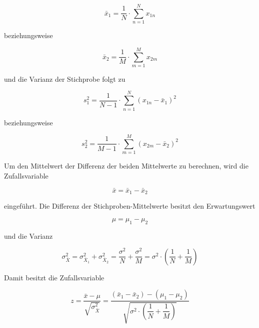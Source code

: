 \begin{equation}\label{eq:fiveseventyfive}
\bar{x}_{1} =\dfrac{1}{N} \cdot \sum _{n=1}^{N}x_{1n}
\end{equation}

\noindent beziehungsweise

\begin{equation}\label{eq:fiveseventysix}
\bar{x}_{2} =\dfrac{1}{M} \cdot \sum _{m=1}^{M}x_{2m}
\end{equation}

\noindent und die Varianz der Stichprobe folgt zu

\begin{equation}\label{eq:fiveseventyseven}
s_{1}^{2} =\dfrac{1}{N-1} \cdot \sum _{n=1}^{N}\left(x_{1n} -\bar{x}_{1} \right)^{2}
\end{equation}

\noindent beziehungsweise

\begin{equation}\label{eq:fiveseventyeight}
s_{2}^{2} =\dfrac{1}{M-1} \cdot \sum _{m=1}^{M}\left(x_{2m} -\bar{x}_{2} \right)^{2}
\end{equation}

\noindent Um den Mittelwert der Differenz der beiden Mittelwerte zu berechnen, wird die Zufallsvariable 

\begin{equation}\label{eq:fiveseventynine}
\bar{x}=\bar{x}_{1} -\bar{x}_{2}
\end{equation}

\noindent eingef\"{u}hrt. Die Differenz der Stichproben-Mittelwerte besitzt den Erwartungswert 

\begin{equation}\label{eq:fiveeighty}
\mu =\mu _{1} -\mu _{2}
\end{equation}

\noindent und die Varianz 

\begin{equation}\label{eq:fiveeightyone}
\sigma _{\bar{X}}^{2} =\sigma _{\bar{X}_{1} }^{2} +\sigma _{\bar{X}_{2} }^{2} =\dfrac{\sigma ^{2} }{N} +\dfrac{\sigma ^{2} }{M} =\sigma ^{2} \cdot \left(\dfrac{1}{N} +\dfrac{1}{M} \right)
\end{equation}

\noindent Damit besitzt die Zufallsvariable

\begin{equation}\label{eq:fiveeightytwo}
z=\dfrac{\bar{x}-\mu }{\sqrt{\sigma _{\bar{X}}^{2} } } =\dfrac{\left(\bar{x}_{1} -\bar{x}_{2} \right)-\left(\mu _{1} -\mu _{2} \right)}{\sqrt{\sigma ^{2} \cdot \left(\dfrac{1}{N} +\dfrac{1}{M} \right)}}
\end{equation}

